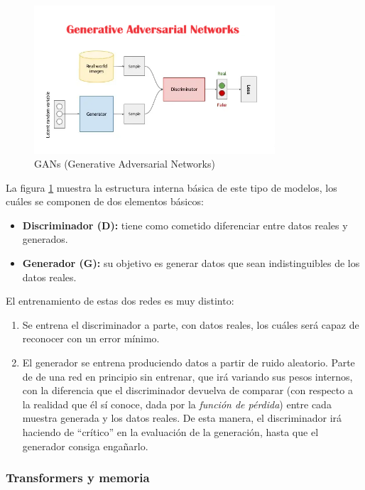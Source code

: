 \begin{figure}[H]
  \centering
  \includegraphics[width=0.8\textwidth]{images/gan.png}
  \caption{GANs (Generative Adversarial Networks)}
  \label{fig:gan}
\end{figure}

La figura \ref{fig:gan} muestra la estructura interna básica de este tipo de modelos, los cuáles se componen de dos elementos básicos:

\begin{itemize}
    \item \textbf{Discriminador (D):} tiene como cometido diferenciar entre datos reales y generados.
    \item \textbf{Generador (G):} su objetivo es generar datos que sean indistinguibles de los datos reales.
\end{itemize}

El entrenamiento de estas dos redes es muy distinto:
\begin{enumerate}
    \item Se entrena el discriminador a parte, con datos reales, los cuáles será capaz de reconocer con un error mínimo.
    \item El generador se entrena produciendo datos a partir de ruido aleatorio. Parte de de una red en principio sin entrenar, que irá variando sus pesos internos, con la diferencia que el discriminador devuelva de comparar (con respecto a la realidad que él sí conoce, dada por la \emph{función de pérdida}) entre cada muestra generada y los datos reales. De esta manera, el discriminador irá haciendo de ``crítico'' en la evaluación de la generación, hasta que el generador consiga engañarlo.
\end{enumerate}

\subsubsection{Transformers y memoria}

